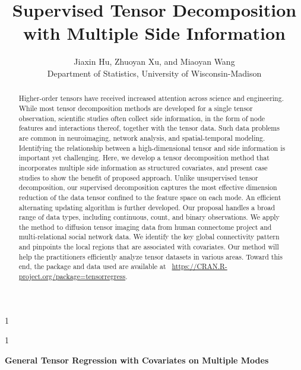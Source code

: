 \documentclass[12pt]{article}
\newcommand{\blind}{1}
\theoremstyle{plain}
\theoremstyle{definition}
\begin{document}
%

\def\spacingset#1{\renewcommand{\baselinestretch}%
{#1}\small\normalsize} \spacingset{1}



\blind
{
  \title{\bf Supervised Tensor Decomposition with Multiple Side Information}
  \author{Jiaxin Hu, Zhuoyan Xu, and Miaoyan Wang\\
    Department of Statistics, University of Wisconsin-Madison}
  \maketitle
} \fi

\blind
{
  \bigskip
  \bigskip
  \bigskip
  \begin{center}
    {\LARGE\bf General Tensor Regression with Covariates on Multiple Modes}
\end{center}
  \medskip
} \fi

\bigskip
\begin{abstract}
Higher-order tensors have received increased attention across science and engineering. While most tensor decomposition methods are developed for a single tensor observation, scientific studies often collect side information, in the form of node features and interactions thereof, together with the tensor data. Such data problems are common in neuroimaging, network analysis, and spatial-temporal modeling. Identifying the relationship between a high-dimensional tensor and side information is important yet challenging. Here, we develop a tensor decomposition method that incorporates multiple side information as structured covariates, and present case studies to show the benefit of proposed approach. Unlike unsupervised tensor decomposition, our supervised decomposition captures the most effective dimension reduction of the data tensor confined to the feature space on each mode. 
An efficient alternating updating algorithm is further developed. Our proposal handles a broad range of data types, including continuous, count, and binary observations. We apply the method to diffusion tensor imaging data from human connectome project and multi-relational social network data. We identify the key global connectivity pattern and pinpoints the local regions that are associated with covariates. Our method will help the practitioners efficiently analyze tensor datasets in various areas. Toward this end, the package and data used are available at ~\url{https://CRAN.R-project.org/package=tensorregress}.

\end{abstract}
\end{document}
